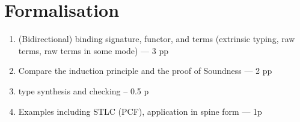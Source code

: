 
\section{Formalisation} \label{sec:formalisation}
\begin{enumerate}
  \item (Bidirectional) binding signature, functor, and terms (extrinsic typing, raw terms, raw terms in some mode) --- 3 pp
  \item Compare the induction principle and the \Agda proof of Soundness --- 2 pp
  \item type synthesis and checking -- 0.5 p
  \item Examples including STLC (PCF), application in spine form --- 1p
\end{enumerate}


